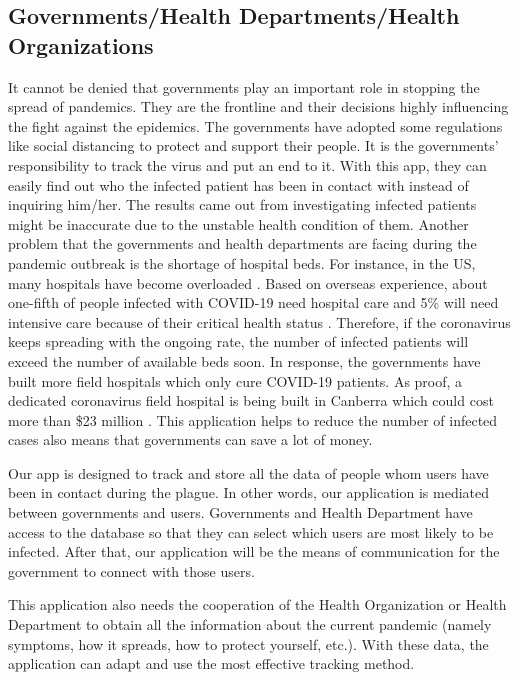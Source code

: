   \subsection{Governments/Health Departments/Health Organizations}
    \par It cannot be denied that governments play an important role in stopping the spread of pandemics. They are the frontline and their decisions highly influencing the fight against the epidemics. The governments have adopted some regulations like social distancing to protect and support their people. It is the governments’ responsibility to track the virus and put an end to it. With this app, they can easily find out who the infected patient has been in contact with instead of inquiring him/her. The results came out from investigating infected patients might be inaccurate due to the unstable health condition of them. Another problem that the governments and health departments are facing during the pandemic outbreak is the shortage of hospital beds. For instance, in the US, many hospitals have become overloaded \parencite{Stake6}. Based on overseas experience, about one-fifth of people infected with COVID-19 need hospital care and 5\% will need intensive care because of their critical health status \parencite{Stake3}. Therefore, if the coronavirus keeps spreading with the ongoing rate, the number of infected patients will exceed the number of available beds soon. In response, the governments have built more field hospitals which only cure COVID-19 patients. As proof, a dedicated coronavirus field hospital is being built in Canberra which could cost more than \$23 million \parencite{Stake7}. This application helps to reduce the number of infected cases also means that governments can save a lot of money.
    \par Our app is designed to track and store all the data of people whom users have been in contact during the plague. In other words, our application is mediated between governments and users. Governments and Health Department have access to the database so that they can select which users are most likely to be infected. After that, our application will be the means of communication for the government to connect with those users.
    \par This application also needs the cooperation of the Health Organization or Health Department to obtain all the information about the current pandemic (namely symptoms, how it spreads, how to protect yourself, etc.). With these data, the application can adapt and use the most effective tracking method.
